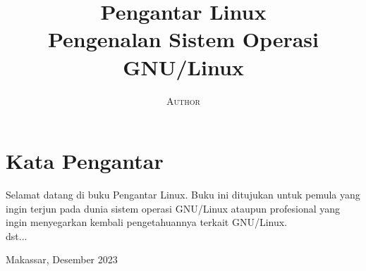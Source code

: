 \documentclass{book}
\title{\Huge \textbf{Pengantar Linux} \\ \huge Pengenalan Sistem Operasi GNU/Linux}
\author{\textsc{Author}}
\begin{document}

\frontmatter

\maketitle

\chapter*{Kata Pengantar}

Selamat datang di buku Pengantar Linux. Buku ini ditujukan untuk pemula yang ingin terjun pada dunia sistem operasi GNU/Linux ataupun profesional yang ingin menyegarkan kembali pengetahuannya terkait GNU/Linux. \\

dst...

\begin{flushright}\noindent
	Makassar, Desember 2023
\end{flushright}

\tableofcontents



\mainmatter










\end{document}
